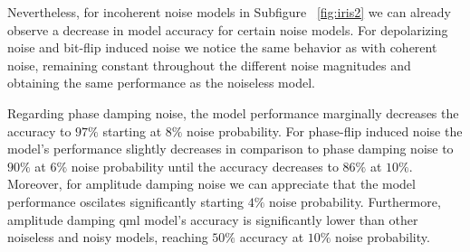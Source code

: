Nevertheless, for incoherent noise models in Subfigure
~\ref{fig:iris2} we can already observe a decrease in
model accuracy for certain noise models. For depolarizing
noise and bit-flip induced noise we notice the same behavior
as with coherent noise, remaining constant throughout
the different noise magnitudes and obtaining the same
performance as the noiseless model. \

Regarding phase damping noise, the model performance
marginally decreases the accuracy to \(97\%\) starting at
\(8\%\) noise probability. For phase-flip induced noise
the model's performance slightly decreases in comparison
to phase damping noise to \(90\%\) at \(6\%\) noise probability
until the accuracy decreases to \(86\%\) at \(10\%\). Moreover,
for amplitude damping noise we can appreciate that the model
performance oscilates significantly starting \(4\%\) noise
probability. Furthermore, amplitude damping \ac{qml}
model's accuracy is significantly lower than other noiseless
and noisy models, reaching \(50\%\) accuracy at \(10\%\)
noise probability. \

